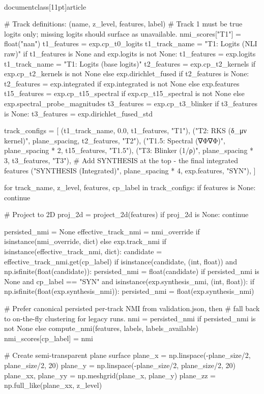 \\documentclass[11pt]{article}
\begin{document}
\begin{CodeBlock}
{{{    # Track definitions: (name, z_level, features, label)
    # Track 1 must be true logits only; missing logits should surface as unavailable.
    nmi_scores["T1"] = float("nan")
    t1_features = exp.cp_t0_logits
    t1_track_name = "T1: Logits (NLI raw)"
    if t1_features is None and exp.logits is not None:
        t1_features = exp.logits
        t1_track_name = "T1: Logits (base logits)"
    t2_features = exp.cp_t2_kernels if exp.cp_t2_kernels is not None else exp.dirichlet_fused
    if t2_features is None:
        t2_features = exp.integrated if exp.integrated is not None else exp.features
    t15_features = exp.cp_t15_spectral if exp.cp_t15_spectral is not None else exp.spectral_probe_magnitudes
    t3_features = exp.cp_t3_blinker
    if t3_features is None:
        t3_features = exp.dirichlet_fused_std

    track_configs = [
        (t1_track_name, 0.0, t1_features, "T1"),
        ("T2: RKS (δ_μν kernel)", plane_spacing, t2_features, "T2"),
        ("T1.5: Spectral (∇Φ∇Φ)", plane_spacing * 2, t15_features, "T1.5"),
        ("T3: Blinker (1/ρ)", plane_spacing * 3, t3_features, "T3"),
        # Add SYNTHESIS at the top - the final integrated features
        ("SYNTHESIS (Integrated)", plane_spacing * 4, exp.features, "SYN"),
    ]

    for track_name, z_level, features, cp_label in track_configs:
        if features is None:
            continue

        # Project to 2D
        proj_2d = project_2d(features)
        if proj_2d is None:
            continue

        persisted_nmi = None
        effective_track_nmi = nmi_override if isinstance(nmi_override, dict) else exp.track_nmi
        if isinstance(effective_track_nmi, dict):
            candidate = effective_track_nmi.get(cp_label)
            if isinstance(candidate, (int, float)) and np.isfinite(float(candidate)):
                persisted_nmi = float(candidate)
        if persisted_nmi is None and cp_label == "SYN" and isinstance(exp.synthesis_nmi, (int, float)):
            if np.isfinite(float(exp.synthesis_nmi)):
                persisted_nmi = float(exp.synthesis_nmi)

        # Prefer canonical persisted per-track NMI from validation.json, then
        # fall back to on-the-fly clustering for legacy runs.
        nmi = persisted_nmi if persisted_nmi is not None else compute_nmi(features, labels, labels_available)
        nmi_scores[cp_label] = nmi

        # Create semi-transparent plane surface
        plane_x = np.linspace(-plane_size/2, plane_size/2, 20)
        plane_y = np.linspace(-plane_size/2, plane_size/2, 20)
        plane_xx, plane_yy = np.meshgrid(plane_x, plane_y)
        plane_zz = np.full_like(plane_xx, z_level)

}}}
\end{CodeBlock}
\end{document}
